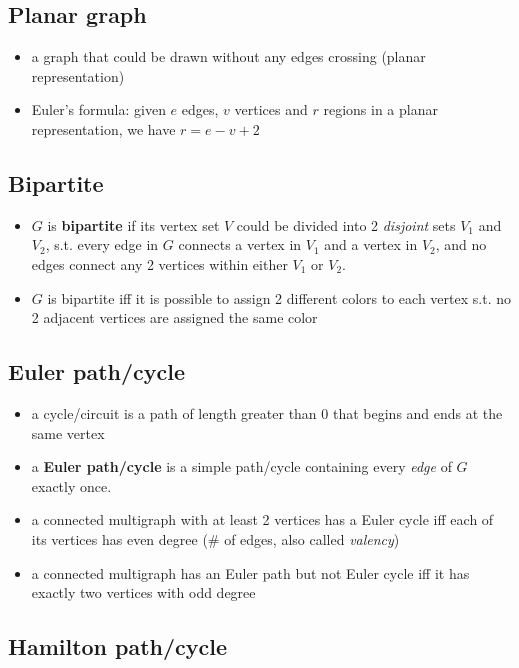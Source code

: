 \documentclass[11pt, oneside]{article}   	%
\begin{document}
\subsection{Planar graph}

\begin{itemize}
\item a graph that could be drawn without any edges crossing (planar representation)
\item Euler's formula: given $e$ edges, $v$ vertices and $r$ regions in a planar representation, we have $r = e - v + 2$
\end{itemize}

\subsection{Bipartite}

\begin{itemize}
    \item $G$ is \textbf{bipartite} if its vertex set $V$ could be divided into 2 \textit{disjoint} sets $V_1$ and $V_2$, s.t. every edge in $G$ connects a vertex in $V_1$ and a vertex in $V_2$, and no edges connect any 2 vertices within either $V_1$ or $V_2$. 
    \item $G$ is bipartite iff it is possible to assign 2 different colors to each vertex s.t. no 2 adjacent vertices are assigned the same color
\end{itemize}

\subsection{Euler path/cycle}

\begin{itemize}
\item a cycle/circuit is a path of length greater than 0 that begins and ends at the same vertex
\item a \textbf{Euler path/cycle} is a simple path/cycle containing every \textit{edge} of $G$ exactly once.
\item a connected multigraph with at least 2 vertices has a Euler cycle iff each of its vertices has even degree (\# of edges, also called \textit{valency})
\item a connected multigraph has an Euler path but not Euler cycle iff it has exactly two vertices with odd degree
\end{itemize}

\subsection{Hamilton path/cycle}
\end{document}
